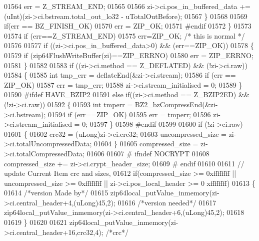 \begin{DoxyCode}
01564           err = Z\_STREAM\_END;
01565 
01566         zi->ci.pos\_in\_buffered\_data += (uInt)(zi->ci.bstream.total\_out\_lo32 - uTotalOutBefore);
01567       \}
01568 
01569       \textcolor{keywordflow}{if}(err == BZ\_FINISH\_OK)
01570         err = ZIP\_OK;
01571 \textcolor{preprocessor}{#endif}
01572     \}
01573 
01574     \textcolor{keywordflow}{if} (err==Z\_STREAM\_END)
01575         err=ZIP\_OK; \textcolor{comment}{/* this is normal */}
01576 
01577     \textcolor{keywordflow}{if} ((zi->ci.pos\_in\_buffered\_data>0) && (err==ZIP\_OK))
01578                 \{
01579         \textcolor{keywordflow}{if} (zip64FlushWriteBuffer(zi)==ZIP\_ERRNO)
01580             err = ZIP\_ERRNO;
01581                 \}
01582 
01583     \textcolor{keywordflow}{if} ((zi->ci.method == Z\_DEFLATED) && (!zi->ci.raw))
01584     \{
01585         \textcolor{keywordtype}{int} tmp\_err = deflateEnd(&zi->ci.stream);
01586         \textcolor{keywordflow}{if} (err == ZIP\_OK)
01587             err = tmp\_err;
01588         zi->ci.stream\_initialised = 0;
01589     \}
01590 \textcolor{preprocessor}{#ifdef HAVE\_BZIP2}
01591     \textcolor{keywordflow}{else} \textcolor{keywordflow}{if}((zi->ci.method == Z\_BZIP2ED) && (!zi->ci.raw))
01592     \{
01593       \textcolor{keywordtype}{int} tmperr = BZ2\_bzCompressEnd(&zi->ci.bstream);
01594                         \textcolor{keywordflow}{if} (err==ZIP\_OK)
01595                                 err = tmperr;
01596                         zi->ci.stream\_initialised = 0;
01597     \}
01598 \textcolor{preprocessor}{#endif}
01599 
01600     \textcolor{keywordflow}{if} (!zi->ci.raw)
01601     \{
01602         crc32 = (uLong)zi->ci.crc32;
01603         uncompressed\_size = zi->ci.totalUncompressedData;
01604     \}
01605     compressed\_size = zi->ci.totalCompressedData;
01606 
01607 \textcolor{preprocessor}{#    ifndef NOCRYPT}
01608     compressed\_size += zi->ci.crypt\_header\_size;
01609 \textcolor{preprocessor}{#    endif}
01610 
01611     \textcolor{comment}{// update Current Item crc and sizes,}
01612     \textcolor{keywordflow}{if}(compressed\_size >= 0xffffffff || uncompressed\_size >= 0xffffffff || zi->ci.pos\_local\_header >= 0
      xffffffff)
01613     \{
01614       \textcolor{comment}{/*version Made by*/}
01615       zip64local\_putValue\_inmemory(zi->ci.central\_header+4,(uLong)45,2);
01616       \textcolor{comment}{/*version needed*/}
01617       zip64local\_putValue\_inmemory(zi->ci.central\_header+6,(uLong)45,2);
01618 
01619     \}
01620 
01621     zip64local\_putValue\_inmemory(zi->ci.central\_header+16,crc32,4); \textcolor{comment}{/*crc*/}

\end{DoxyCode}
